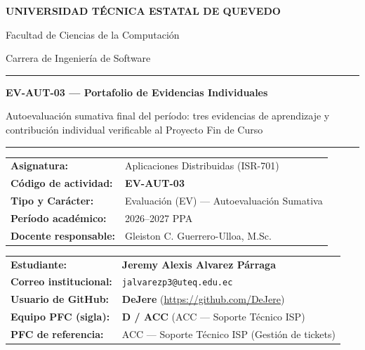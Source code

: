 \documentclass[11pt,a4paper]{article}
\begin{document}
\begin{center}
{\large\bfseries UNIVERSIDAD T\'ECNICA ESTATAL DE QUEVEDO\par}
\vspace{0.15cm}
{\normalsize Facultad de Ciencias de la Computaci\'on\par}
{\normalsize Carrera de Ingenier\'ia de Software\par}
\vspace{0.8cm}
\rule{0.85\textwidth}{0.6pt}\par
\vspace{0.4cm}
{\Large\bfseries EV-AUT-03 --- Portafolio de Evidencias Individuales\par}
\vspace{0.2cm}
{\normalsize Autoevaluaci\'on sumativa final del per\'iodo: tres evidencias de aprendizaje y contribuci\'on individual verificable al Proyecto Fin de Curso\par}
\vspace{0.4cm}
\rule{0.85\textwidth}{0.6pt}\par
\end{center}

\vspace{0.8cm}
\begin{tabular}{ll}
\textbf{Asignatura:}            & Aplicaciones Distribuidas (ISR-701) \\
\textbf{C\'odigo de actividad:} & \textbf{EV-AUT-03} \\
\textbf{Tipo y Car\'acter:}     & Evaluaci\'on (EV) --- Autoevaluaci\'on Sumativa \\
\textbf{Per\'iodo acad\'emico:} & 2026--2027 PPA \\
\textbf{Docente responsable:}   & Gleiston C. Guerrero-Ulloa, M.Sc. \\
\end{tabular}

\vspace{0.8cm}
\begin{tabular}{ll}
\textbf{Estudiante:}            & \textbf{Jeremy Alexis Alvarez Párraga} \\
\textbf{Correo institucional:}  & \texttt{jalvarezp3@uteq.edu.ec} \\
\textbf{Usuario de GitHub:}     & \textbf{DeJere} (\url{https://github.com/DeJere}) \\
\textbf{Equipo PFC (sigla):}    & \textbf{D / ACC} (ACC --- Soporte T\'ecnico ISP) \\
\textbf{PFC de referencia:}     & ACC --- Soporte T\'ecnico ISP (Gesti\'on de tickets) \\
\end{tabular}
\end{document}
